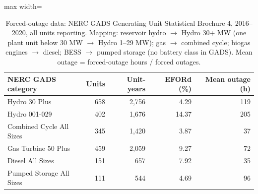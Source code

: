 \begin{table}[!htbp]
\centering
\small
\caption{Forced-outage data: NERC GADS Generating Unit Statistical Brochure 4, 2016--2020, all units reporting. Mapping: reservoir hydro $\to$ Hydro 30+ MW (one plant unit below 30 MW $\to$ Hydro 1--29 MW); gas $\to$ combined cycle; biogas engines $\to$ diesel; BESS $\to$ pumped storage (no battery class in GADS). Mean outage = forced-outage hours / forced outages.}
\label{tab:gads}
\begin{adjustbox}{max width=\linewidth}
\begin{tabular}{lrrrr}
\toprule
NERC GADS category & Units & Unit-years & EFORd (\%) & Mean outage (h) \\
\midrule
Hydro 30 Plus & 658 & 2,756 & 4.29 & 119 \\
Hydro 001-029 & 402 & 1,676 & 14.37 & 205 \\
Combined Cycle All Sizes & 345 & 1,420 & 3.87 & 37 \\
Gas Turbine 50 Plus & 459 & 2,059 & 9.27 & 72 \\
Diesel All Sizes & 151 & 657 & 7.92 & 35 \\
Pumped Storage All Sizes & 111 & 544 & 4.69 & 96 \\
\bottomrule
\end{tabular}
\end{adjustbox}
\end{table}
